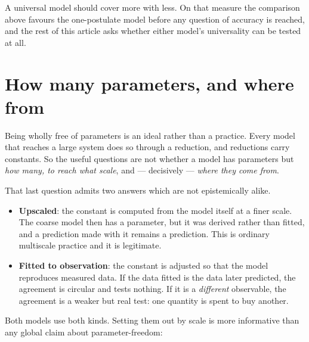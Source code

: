 \documentclass[11pt]{article}
\begin{document}
A universal model should cover more with less. On that measure the comparison above favours the
one-postulate model before any question of accuracy is reached, and the rest of this article asks
whether either model's universality can be tested at all.


\section{How many parameters, and where from}\label{sec:params}

Being wholly free of parameters is an ideal rather than a practice. Every model that reaches a
large system does so through a reduction, and reductions carry constants. So the useful questions
are not whether a model has parameters but \emph{how many, to reach what scale}, and ---
decisively --- \emph{where they come from}.

That last question admits two answers which are not epistemically alike.

\begin{itemize}
\item \textbf{Upscaled}: the constant is computed from the model itself at a finer scale. The
coarse model then has a parameter, but it was derived rather than fitted, and a prediction made
with it remains a prediction. This is ordinary multiscale practice and it is legitimate.
\item \textbf{Fitted to observation}: the constant is adjusted so that the model reproduces
measured data. If the data fitted is the data later predicted, the agreement is circular and
tests nothing. If it is a \emph{different} observable, the agreement is a weaker but real test:
one quantity is spent to buy another.
\end{itemize}

Both models use both kinds. Setting them out by scale is more informative than any global claim
about parameter-freedom:
\end{document}
